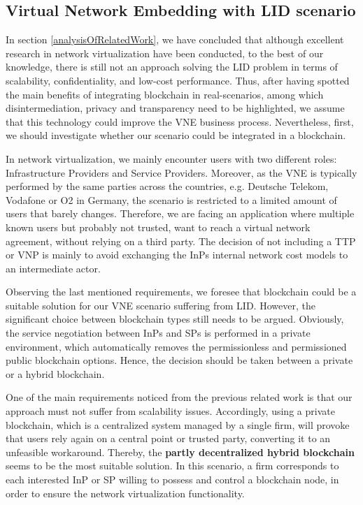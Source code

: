 \subsection{Virtual Network Embedding with LID scenario}

In section \ref{analysisOfRelatedWork}, we have concluded that although excellent research in network virtualization have been conducted, to the best of our knowledge, there is still not an approach solving the LID problem in terms of scalability, confidentiality, and low-cost performance. Thus, after having spotted the main benefits of integrating blockchain in real-scenarios, among which disintermediation, privacy  and transparency need to be highlighted, we assume that this technology could improve the VNE business process. Nevertheless, first, we should investigate whether our scenario could be integrated in a blockchain.

In network virtualization, we mainly encounter users with two different roles: Infrastructure Providers and Service Providers. Moreover, as the VNE is typically performed by the same parties across the countries, e.g. Deutsche Telekom, Vodafone or O2 in Germany, the scenario is restricted to a limited amount of users that barely changes. Therefore, we are facing an application where multiple known users but probably not trusted, want to reach a virtual network agreement, without relying on a third party. The decision of not including a TTP or VNP is mainly to avoid exchanging the InPs internal network cost models to an intermediate actor.

Observing the last mentioned requirements, we foresee that blockchain could be a suitable solution for our VNE scenario suffering from LID. However, the significant choice between blockchain types still needs to be argued. Obviously, the service negotiation between InPs and SPs is performed in a private environment, which automatically removes the permissionless and permissioned public blockchain options. Hence, the decision should be taken between a private or a hybrid blockchain.

One of the main requirements noticed from the previous related work is that our approach must not suffer from scalability issues. Accordingly, using a private blockchain, which is a centralized system managed by a single firm, will provoke that users rely again on a central point or trusted party, converting it to an unfeasible workaround. Thereby, the \textbf{partly decentralized hybrid blockchain} seems to be the most suitable solution. In this scenario, a firm corresponds to each interested InP or SP willing to possess and control a blockchain node, in order to ensure the network virtualization functionality.


